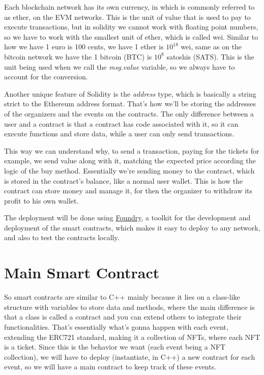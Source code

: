 Each blockchain network has its own currency, in which is commonly referred to
as ether, on the EVM networks. This is the unit of value that is used to pay to
execute transactions, but in solidity we cannot work with floating point
numbers, so we have to work with the smallest unit of ether, which is called
wei. Similar to how we have 1 euro is 100 cents, we have 1 ether is $10^{18}$
wei, same as on the bitcoin network we have the 1 bitcoin (BTC) is $10^{8}$
satoshis (SATS). This is the unit being used when we call the
\textit{msg.value} variable, so we always have to account for the conversion.

Another unique feature of Solidity is the \textit{address} type, which is
basically a string strict to the Ethereum address format. That's how we'll be
storing the addresses of the organizers and the events on the contracts. The
only difference between a user and a contract is that a contract has code
associated with it, so it can execute functions and store data, while a user
can only send transactions.

This way we can understand why, to send a transaction, paying for the tickets
for example, we send value along with it, matching the expected price according
the logic of the buy method. Essentially we're sending money to the contract,
which is stored in the contract's balance, like a normal user wallet. This is
how the contract can store money and manage it, for then the organizer to
withdraw its profit to his own wallet.

The deployment will be done using \href{https://book.getfoundry.sh/}{Foundry},
a toolkit for the development and deployment of the smart contracts, which
makes it easy to deploy to any network, and also to test the contracts locally.

\section{Main Smart Contract}
\label{sec:main_smart_contract}

So smart contracts are similar to C++ mainly because it lies on a class-like
structure with variables to store data and methods, where the main difference
is that a class is called a contract and you can extend others to integrate
their functionalities. That's essentially what's gonna happen with each event,
extending the ERC721 standard, making it a collection of NFTs, where each NFT
is a ticket. Since this is the behavior we want (each event being a NFT
collection), we will have to deploy (instantiate, in C++) a new contract for
each event, so we will have a main contract to keep track of these events.

